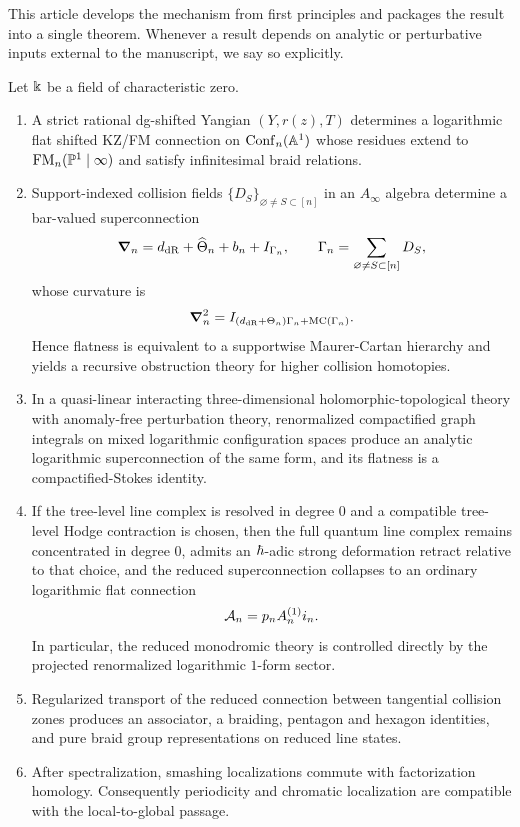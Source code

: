 This article develops the mechanism from first principles and packages the result into a single theorem. Whenever a result depends on analytic or perturbative inputs external to the manuscript, we say so explicitly.

\begin{theorem}%
Let $\Bbbk$ be a field of characteristic zero.
\begin{enumerate}[label=\textup{(\roman*)}]
 \item A strict rational dg-shifted Yangian $(Y,r(z),T)$ determines a logarithmic flat shifted KZ/FM connection on $\mathrm{Conf}_n(\mathbb A^1)$ whose residues extend to $\mathrm{FM}_n(\mathbb P^1\mid\infty)$ and satisfy infinitesimal braid relations.
 \item Support-indexed collision fields $\{D_S\}_{\varnothing\neq S\subset[n]}$ in an $A_\infty$ algebra determine a bar-valued superconnection
 \[
 \boldsymbol{\nabla}_n=d_{\mathrm{dR}}+\widehat\Theta_n+b_n+I_{\Gamma_n},\qquad \Gamma_n=\sum_{\varnothing\neq S\subset[n]}D_S,
 \]
 whose curvature is
 \[
 \boldsymbol{\nabla}_n^2 = I_{(d_{\mathrm{dR}}+\Theta_n)\Gamma_n+\mathrm{MC}(\Gamma_n)}.
 \]
 Hence flatness is equivalent to a supportwise Maurer-Cartan hierarchy and yields a recursive obstruction theory for higher collision homotopies.
 \item In a quasi-linear interacting three-dimensional holomorphic-topological theory with anomaly-free perturbation theory, renormalized compactified graph integrals on mixed logarithmic configuration spaces produce an analytic logarithmic superconnection of the same form, and its flatness is a compactified-Stokes identity.
 \item If the tree-level line complex is resolved in degree $0$ and a compatible tree-level Hodge contraction is chosen, then the full quantum line complex remains concentrated in degree $0$, admits an $\hbar$-adic strong deformation retract relative to that choice, and the reduced superconnection collapses to an ordinary logarithmic flat connection
 \[
 \mathcal A_n = p_n A_n^{(1)} i_n.
 \]
 In particular, the reduced monodromic theory is controlled directly by the projected renormalized logarithmic $1$-form sector.
 \item Regularized transport of the reduced connection between tangential collision zones produces an associator, a braiding, pentagon and hexagon identities, and pure braid group representations on reduced line states.
 \item After spectralization, smashing localizations commute with factorization homology. Consequently periodicity and chromatic localization are compatible with the local-to-global passage.
\end{enumerate}
\end{theorem}

